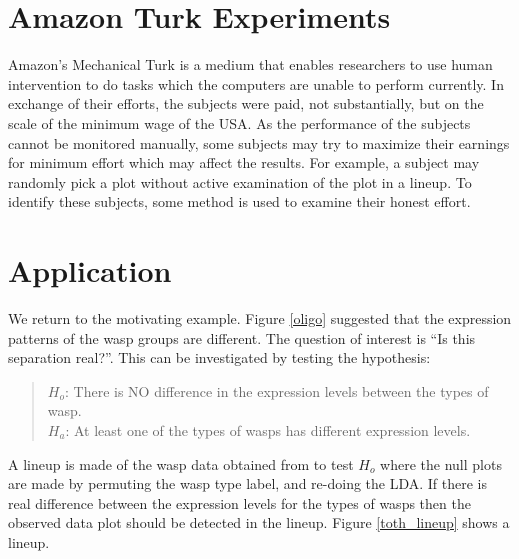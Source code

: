 \section{Amazon Turk Experiments}

Amazon's Mechanical Turk \citep{turk} is a medium that enables researchers to use human intervention to do tasks which the computers are unable to perform currently. In exchange of their efforts, the subjects were paid, not substantially, but on the scale of the minimum wage of the USA. As the performance of the subjects cannot be monitored manually, some subjects may try to maximize their earnings for minimum effort which may affect the results. For example, a subject may randomly pick a plot without active examination of the plot in a lineup. To identify these subjects, some method is used to examine their honest effort. 

\section{Application}

We return to the motivating example. Figure \ref{oligo} suggested that the expression patterns of the wasp groups are different.  The question of interest is ``Is this separation real?''. This can be investigated by testing the hypothesis: 

\begin{quote}
$H_o$: There is NO difference in the expression levels between the types of wasp.\\
$H_a$: At least one of the types of wasps has different expression levels.
\end{quote}
A lineup is made of the wasp data obtained from \cite{toth:2010} to test $H_o$ where the null plots are made by permuting the wasp type label, and re-doing the LDA. If there is real difference between the expression levels for the types of wasps then the observed data plot should be detected in the lineup. Figure \ref{toth_lineup} shows a lineup. 


